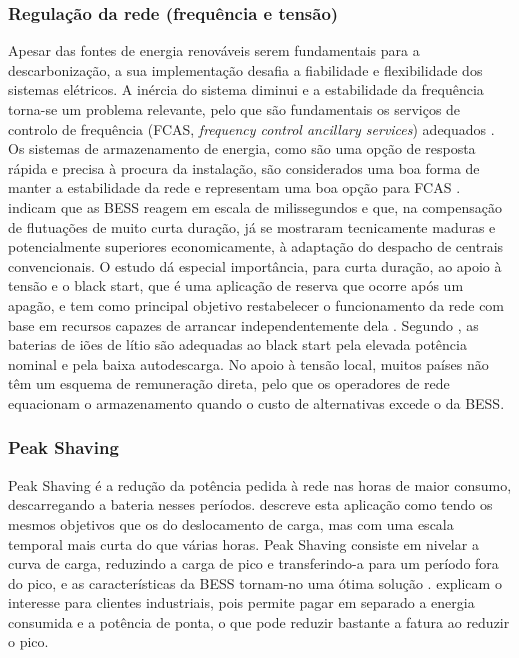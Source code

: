 \subsubsection{Regulação da rede (frequência e tensão)}
\label{sec:Ch2.1.6.2}

Apesar das fontes de energia renováveis serem fundamentais para a descarbonização, a sua implementação desafia a fiabilidade e flexibilidade dos sistemas elétricos. A inércia do sistema diminui e a estabilidade da frequência torna-se um problema relevante, pelo que são fundamentais os serviços de controlo de frequência (FCAS, \textit{frequency control ancillary services}) adequados \cite{Garttan2025 }. Os sistemas de armazenamento de energia, como são uma opção de resposta rápida e precisa à procura da instalação, são considerados uma boa forma de manter a estabilidade da rede e representam uma boa opção para FCAS \cite{Garttan2025 }. \textcite{ Hesse2017} indicam que as BESS reagem em escala de milissegundos e que, na compensação de flutuações de muito curta duração, já se mostraram tecnicamente maduras e potencialmente superiores economicamente, à adaptação do despacho de centrais convencionais.
O estudo \textcite{Zhao2023} dá especial importância, para curta duração, ao apoio à tensão e o black start, que é uma aplicação de reserva que ocorre após um apagão, e tem como principal objetivo restabelecer o funcionamento da rede com base em recursos capazes de arrancar independentemente dela \cite{ Zhao2023}. Segundo \textcite{ Hesse2017}, as baterias de iões de lítio são adequadas ao black start pela elevada potência nominal e pela baixa autodescarga. No apoio à tensão local, muitos países não têm um esquema de remuneração direta, pelo que os operadores de rede equacionam o armazenamento quando o custo de alternativas excede o da BESS.


\subsubsection{Peak Shaving }
\label{sec:Ch2.1.6.3}

Peak Shaving é a redução da potência pedida à rede nas horas de maior consumo, descarregando a bateria nesses períodos. \textcite{ Aimone2018} descreve esta aplicação como tendo os mesmos objetivos que os do deslocamento de carga, mas com uma escala temporal mais curta do que várias horas.  Peak Shaving consiste em nivelar a curva de carga, reduzindo a carga de pico e transferindo-a para um período fora do pico, e as características da BESS tornam-no uma ótima solução \cite{ Prakash2022}. \textcite{ Hesse2017} explicam o interesse para clientes industriais, pois permite pagar em separado a energia consumida e a potência de ponta, o que pode reduzir bastante a fatura ao reduzir o pico. 

